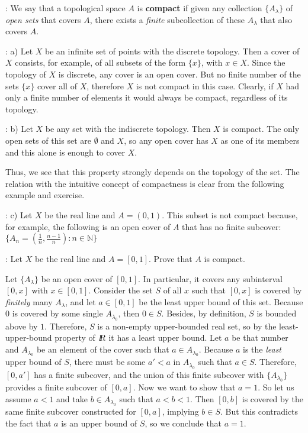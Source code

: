 : We say that a topological space $A$ is {\bf compact} if given any collection
$\{A_{\lambda}\}$ of {\it open sets} that covers $A$, there exists a {\it finite}
subcollection of these $A_{\lambda}$ that also covers $A$.

\ejem: a) Let $X$ be an infinite set of points with the discrete topology.
Then a cover of $X$ consists, for example, of all subsets of the form $\{x\}$, with $x \in X$. Since the topology of $X$ is
discrete, any cover is an open cover. But no finite number of the sets $\{x\}$
cover all of $X$, therefore $X$ is not compact in this case.
Clearly, if $X$ had only a finite number of elements
it would always be compact, regardless of its topology.

\ejem: b) Let $X$ be any set with the indiscrete topology.
Then $X$ is compact. The only open sets of this set are
$\emptyset$ and $X$, so any open cover has $X$ as
one of its members and this alone is enough to cover $X$.

Thus, we see that this property strongly depends on the topology
of the set. The relation with the intuitive concept of compactness
is clear from the following example and exercise.

\ejem: c) Let $X$ be the real line and $A = (0,1)$. This subset is not compact
because, for example, the following is an open cover of $A$ that has no finite subcover: $\{ A_n = (\frac{1}{n}, \frac{n-1}{n}) \colon n \in \mathbb{N}\}$

\ejer: Let $X$ be the real line and $A = [0,1]$. Prove that $A$ is compact.

\bpru

Let $\{A_{\lambda}\}$ be an open cover of $[0,1]$. In particular, it covers any subinterval $[0,x]$ with $x \in [0,1]$. Consider the set $S$ of all $x$ such that $[0,x]$ is covered by \textit{finitely} many $A_\lambda$, and let $a \in [0,1]$ be the least upper bound 
of this set. Because $0$ is covered by some single $A_\lambda_0$, then $0 \in S$. Besides, by definition, $S$ is bounded above by $1$. Therefore, $S$ is a non-empty upper-bounded real set, so by the least-upper-bound property of $\mbox{\sl {l$\!\!\!\;\:\!$R}}$ it has a least upper bound. Let $a$ be that number and $A_{\lambda_0}$ be an element of the cover
such that $a \in A_{\lambda_0}$. Because $a$ is the \textit{least} upper bound of $S$, there must be some $a'<a$ in $A_{\lambda_0}$ such that $a \in S$. Therefore, $[0,a']$ has a finite subcover, and the union of this finite subcover with $\{A_\lambda_0\}$ provides a finite subcover of $[0,a]$. Now we want to show that $a=1$. So let us assume $a<1$ and take $b \in A_\lambda_0$ such that $a < b < 1$. Then $[0,b]$ is covered by the same finite subcover constructed for $[0,a]$, implying $b \in S$. But this contradicts the fact that $a$ is an upper bound of $S$, so we conclude that $a=1$. 
\epru

